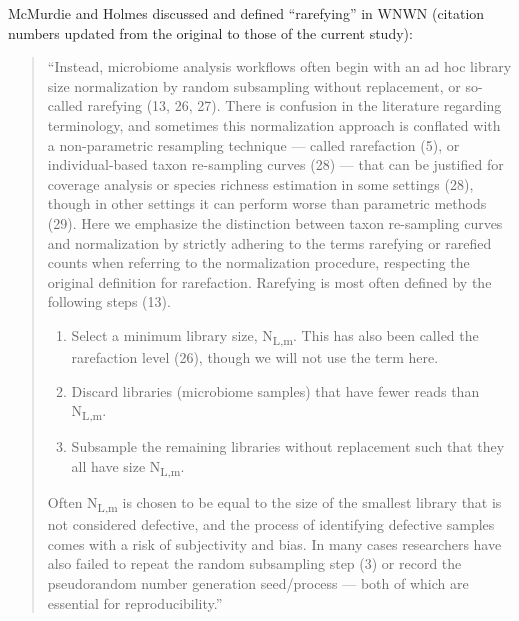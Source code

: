 \documentclass[
]{article}
\providecommand{\tightlist}{%
  \setlength{\itemsep}{0pt}\setlength{\parskip}{0pt}}
\begin{document}
McMurdie and Holmes discussed and defined ``rarefying'' in WNWN
(citation numbers updated from the original to those of the current
study):

\begin{quote}
``Instead, microbiome analysis workflows often begin with an ad hoc
library size normalization by random subsampling without replacement, or
so-called rarefying (13, 26, 27). There is confusion in the literature
regarding terminology, and sometimes this normalization approach is
conflated with a non-parametric resampling technique --- called
rarefaction (5), or individual-based taxon re-sampling curves (28) ---
that can be justified for coverage analysis or species richness
estimation in some settings (28), though in other settings it can
perform worse than parametric methods (29). Here we emphasize the
distinction between taxon re-sampling curves and normalization by
strictly adhering to the terms rarefying or rarefied counts when
referring to the normalization procedure, respecting the original
definition for rarefaction. Rarefying is most often defined by the
following steps (13).

\begin{enumerate}
\def\labelenumi{\arabic{enumi}.}
\tightlist
\item
  Select a minimum library size, N\textsubscript{L,m}. This has also
  been called the rarefaction level (26), though we will not use the
  term here.
\item
  Discard libraries (microbiome samples) that have fewer reads than
  N\textsubscript{L,m}.
\item
  Subsample the remaining libraries without replacement such that they
  all have size N\textsubscript{L,m}.
\end{enumerate}

Often N\textsubscript{L,m} is chosen to be equal to the size of the
smallest library that is not considered defective, and the process of
identifying defective samples comes with a risk of subjectivity and
bias. In many cases researchers have also failed to repeat the random
subsampling step (3) or record the pseudorandom number generation
seed/process --- both of which are essential for reproducibility.''
\end{quote}
\end{document}

